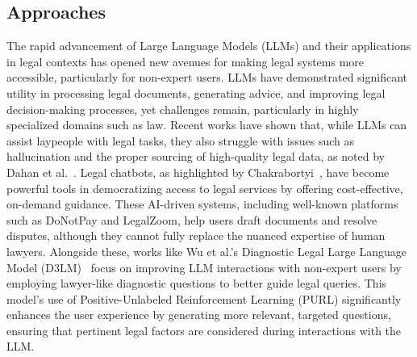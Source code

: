 \subsection{Approaches}
The rapid advancement of Large Language Models (LLMs) and their applications 
in legal contexts has opened new avenues for making legal systems more 
accessible, particularly for non-expert users. LLMs have demonstrated 
significant utility in processing legal documents, generating advice, 
and improving legal decision-making processes, yet challenges remain, 
particularly in highly specialized domains such as law. Recent works have 
shown that, while LLMs can assist laypeople with legal tasks, they also 
struggle with issues such as hallucination and the proper sourcing of 
high-quality legal data, as noted by Dahan et al.~\cite{dahan2023lawyers}.
Legal chatbots, as highlighted by Chakrabortyi~\cite{chakraborty2023revolutionizing}, 
have become powerful tools in democratizing access to legal services by 
offering cost-effective, on-demand guidance. These AI-driven systems, 
including well-known platforms such as DoNotPay and LegalZoom, 
help users draft documents and resolve disputes, although they cannot 
fully replace the nuanced expertise of human lawyers. Alongside these, 
works like Wu et al.'s Diagnostic Legal Large Language Model 
(D3LM)~\cite{wu2024knowledgeinfusedlegalwisdomnavigating} focus on improving LLM 
interactions with non-expert users by employing lawyer-like diagnostic 
questions to better guide legal queries. This model's use of 
Positive-Unlabeled Reinforcement Learning (PURL) significantly 
enhances the user experience by generating more relevant, targeted questions, 
ensuring that pertinent legal factors are considered during interactions 
with the LLM.
